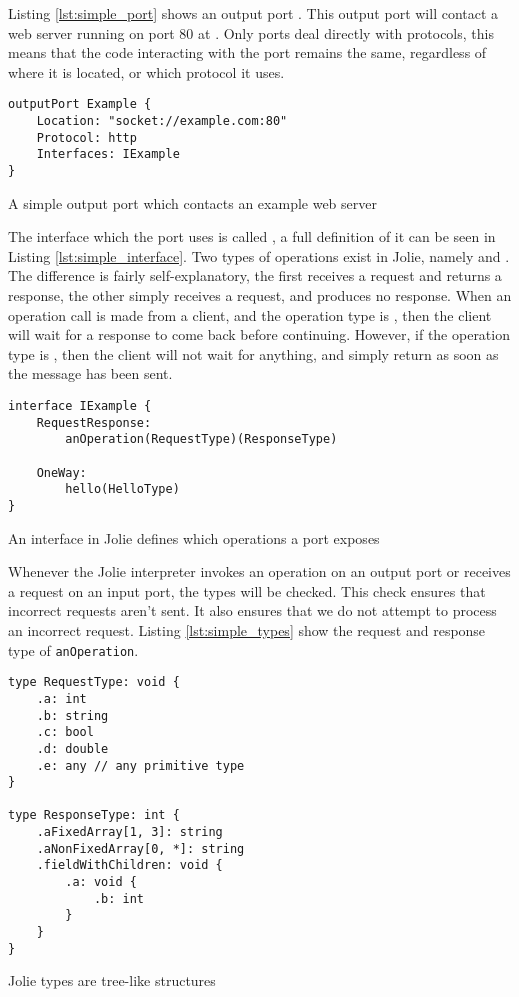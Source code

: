 Listing \ref{lst:simple_port} shows an output port . This
output port will contact a web server running  on port 80 at
. Only ports deal directly with protocols, this means that
the code interacting with the port remains the same, regardless of where it is
located, or which protocol it uses.

\begin{listing}[H]
\begin{verbatim}
outputPort Example {
    Location: "socket://example.com:80"
    Protocol: http
    Interfaces: IExample
}
\end{verbatim}
\caption{A simple output port which contacts an example web server}
\label{lst:simple_port}
\end{listing}

The interface which the port uses is called , a full
definition of it can be seen in Listing \ref{lst:simple_interface}. Two types
of operations exist in Jolie, namely  and
.  The difference is fairly self-explanatory, the first receives
a request and returns a response, the other simply receives a request, and
produces no response. When an operation call is made from a client, and the
operation type is , then the client will wait for a
response to come back before continuing.  However, if the operation type is
, then the client will not wait for anything, and simply return
as soon as the message has been sent.

\begin{listing}[H]
\begin{verbatim}
interface IExample {
    RequestResponse:
        anOperation(RequestType)(ResponseType)

    OneWay:
        hello(HelloType)
}
\end{verbatim}
\caption{An interface in Jolie defines which operations a port exposes}
\label{lst:simple_interface}
\end{listing}

Whenever the Jolie interpreter invokes an operation on an output port or
receives a request on an input port, the types will be checked. This check
ensures that incorrect requests aren't sent. It also ensures that we do not
attempt to process an incorrect request. Listing \ref{lst:simple_types} show
the request and response type of \verb!anOperation!.

\begin{listing}[H]
\begin{verbatim}
type RequestType: void {
    .a: int
    .b: string
    .c: bool
    .d: double
    .e: any // any primitive type
}

type ResponseType: int {
    .aFixedArray[1, 3]: string
    .aNonFixedArray[0, *]: string
    .fieldWithChildren: void {
        .a: void {
            .b: int
        }
    }
}
\end{verbatim}
\caption{Jolie types are tree-like structures}
\label{lst:simple_types}
\end{listing}

